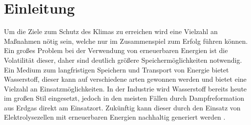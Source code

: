 \chapter{Einleitung}
Um die Ziele zum Schutz des Klimas zu erreichen wird eine Vielzahl an Maßnahmen nötig sein, welche nur im Zusammenspiel zum Erfolg führen können. Ein großes Problem bei der Verwendung von erneuerbaren Energien ist die Volatilität dieser, daher sind deutlich größere Speichermöglichkeiten notwendig. Ein Medium zum langfristigen Speichern und Transport von Energie bietet Wasserstoff, dieser kann auf verschiedene arten gewonnen werden und bietet eine Vielzahl an Einsatzmöglichkeiten. In der Industrie wird Wasserstoff bereits heute im großen Stil eingesetzt, jedoch in den meisten Fällen durch Dampfreformation aus Erdgas direkt am Einsatzort. Zukünftig kann dieser durch den Einsatz von Elektrolysezellen mit erneuerbaren Energien nachhaltig generiert werden \cite{Elektrolyse} . 




